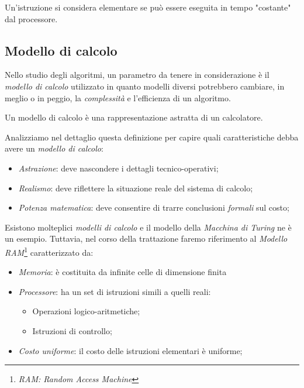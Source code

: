\begin{definition}
    Un’istruzione si considera elementare se può essere eseguita
    in tempo "costante" dal processore.
\end{definition}

\newpage
\subsection{Modello di calcolo}
Nello studio degli algoritmi, un parametro da tenere in considerazione è il
\emph{modello di calcolo} utilizzato in quanto modelli diversi potrebbero
cambiare, in meglio o in peggio, la \emph{complessità} e l'efficienza di un
algoritmo.

\begin{definition}
    Un modello di calcolo è una rappresentazione astratta di un calcolatore.
\end{definition}\noindent
Analizziamo nel dettaglio questa definizione per capire quali caratteristiche
debba avere un \emph{modello di calcolo}:
\begin{itemize}
    \item \emph{Astrazione}: deve nascondere i dettagli tecnico-operativi;
    \item \emph{Realismo}: deve riflettere la situazione reale del sistema di
    calcolo;
    \item \emph{Potenza matematica}: deve consentire di trarre conclusioni
    \emph{formali} sul costo;
\end{itemize}
Esistono molteplici \emph{modelli di calcolo} e il modello della \emph{Macchina
di Turing} ne è un esempio. Tuttavia, nel corso della trattazione faremo
riferimento al \emph{Modello RAM}\footnote{\emph{RAM: Random Access Machine}}
caratterizzato da:
\begin{itemize}
    \item \emph{Memoria}: è costituita da infinite celle di dimensione finita
    \item \emph{Processore}: ha un set di istruzioni simili a quelli reali:
    \begin{itemize}
        \item Operazioni logico-aritmetiche;
        \item Istruzioni di controllo;
    \end{itemize}
    \item \emph{Costo uniforme}: il costo delle istruzioni elementari è
    uniforme;
\end{itemize}

